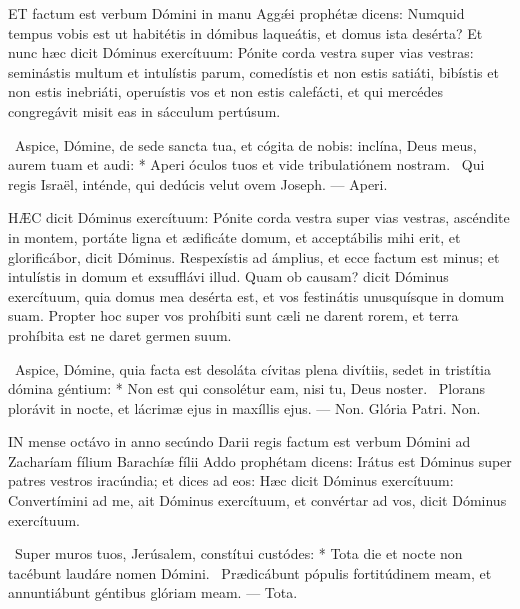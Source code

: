 
\lettrine[lines=2]{E}{T} factum est verbum Dómini in manu Aggǽi prophétæ dicens: Numquid tempus vobis est ut habitétis in dómibus laqueátis, et domus ista desérta? Et nunc hæc dicit Dóminus exercítuum: Pónite corda vestra super vias vestras: seminástis multum et intulístis parum, comedístis et non estis satiáti, bibístis et non estis inebriáti, operuístis vos et non estis calefácti, et qui mercédes congregávit misit eas in sácculum pertúsum.

\R\ Aspice, Dómine, de sede sancta tua, et cógita de nobis: inclína, Deus meus, aurem tuam et audi: * Aperi óculos tuos et vide tribulatiónem nostram. \V\ Qui regis Israël, inténde, qui dedúcis velut ovem Joseph. — Aperi.



\lettrine[lines=2]{H}{ÆC} dicit Dóminus exercítuum: Pónite corda vestra super vias vestras, ascéndite in montem, portáte ligna et ædificáte domum, et acceptábilis mihi erit, et glorificábor, dicit Dóminus. Respexístis ad ámplius, et ecce factum est minus; et intulístis in domum et exsufflávi illud. Quam ob causam? dicit Dóminus exercítuum, quia domus mea desérta est, et vos festinátis unusquísque in domum suam. Propter hoc super vos prohíbiti sunt cæli ne darent rorem, et terra prohíbita est ne daret germen suum.

\R\ Aspice, Dómine, quia facta est desoláta cívitas plena divítiis, sedet in tristítia dómina géntium: * Non est qui consolétur eam, nisi tu, Deus noster. \V\ Plorans plorávit in nocte, et lácrimæ ejus in maxíllis ejus. — Non. Glória Patri. Non.




\lettrine[lines=2]{I}{N} mense octávo in anno secúndo Darii regis factum est verbum Dómini ad Zacharíam fílium Barachíæ fílii Addo prophétam dicens: Irátus est Dóminus super patres vestros iracúndia; et dices ad eos: Hæc dicit Dóminus exercítuum: Convertímini ad me, ait Dóminus exercítuum, et convértar ad vos, dicit Dóminus exercítuum.

\R\ Super muros tuos, Jerúsalem, constítui custódes: * Tota die et nocte non tacébunt laudáre nomen Dómini. \V\ Prædicábunt pópulis fortitúdinem meam, et annuntiábunt géntibus glóriam meam. — Tota.

